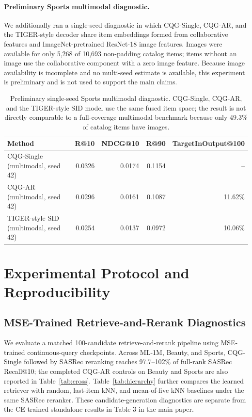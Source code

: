 \documentclass[letterpaper]{article}
\begin{document}
\paragraph{Preliminary Sports multimodal diagnostic.}
We additionally ran a single-seed diagnostic in which CQG-Single, CQG-AR, and the TIGER-style decoder share item embeddings formed from collaborative features and ImageNet-pretrained ResNet-18 image features. Images were available for only 5,268 of 10,693 non-padding catalog items; items without an image use the collaborative component with a zero image feature. Because image availability is incomplete and no multi-seed estimate is available, this experiment is preliminary and is not used to support the main claims.
\begin{table}[H]
\centering
\small
\begin{tabular}{lrrrr}
\toprule
Method & R@10 & NDCG@10 & R@90 & TargetInOutput@100 \\
\midrule
CQG-Single (multimodal, seed 42) & 0.0326 & 0.0174 & 0.1154 & -- \\
CQG-AR (multimodal, seed 42) & 0.0296 & 0.0161 & 0.1087 & 11.62\% \\
TIGER-style SID (multimodal, seed 42) & 0.0254 & 0.0137 & 0.0972 & 10.06\% \\
\bottomrule
\end{tabular}
\caption{Preliminary single-seed Sports multimodal diagnostic. CQG-Single,
CQG-AR, and the TIGER-style SID model use the same fused item space; the result
is not directly comparable to a full-coverage multimodal benchmark because only
49.3\% of catalog items have images.}
\label{tab:auto-sports-mm}
\end{table}


\section{Experimental Protocol and Reproducibility}
\label{app:protocol}

\subsection{MSE-Trained Retrieve-and-Rerank Diagnostics}
\label{app:mse-rerank}

We evaluate a matched 100-candidate retrieve-and-rerank pipeline using
MSE-trained continuous-query checkpoints. Across ML-1M, Beauty, and Sports,
CQG-Single followed by SASRec reranking reaches 97.7--102\% of full-rank
SASRec Recall@10; the completed CQG-AR controls on Beauty and Sports are also
reported in Table~\ref{tab:cross}. Table~\ref{tab:hierarchy} further
compares the learned retriever with random, last-item kNN, and mean-of-five
kNN baselines under the same SASRec reranker. These candidate-generation
diagnostics are separate from the CE-trained standalone results in
Table 3 in the main paper.
\end{document}
